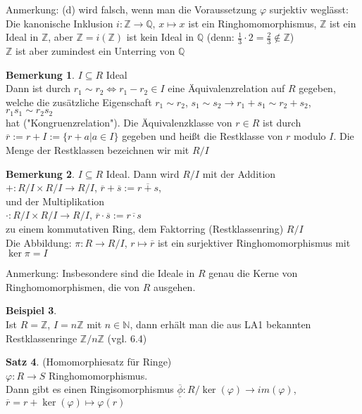 \documentclass[10pt,a4paper,numbers=endperiod]{scrartcl}
\theoremstyle{definition}
\newtheorem{satz}{Satz}[section]
\newtheorem{bem}[satz]{Bemerkung}
\newtheorem{bsp}[satz]{Beispiel}
\def\QQ{{\mathbb Q}}
\def\NN{{\mathbb N}}
\def\ZZ{{\mathbb Z}}
\begin{document}
Anmerkung: (d) wird falsch, wenn man die Voraussetzung $\varphi$ surjektiv weglässt:\\
Die kanonische Inklusion $i: \ZZ \rightarrow \QQ$, $x \mapsto x$ ist ein Ringhomomorphismus, $\ZZ$ ist ein Ideal in $\ZZ$, aber $\ZZ = i(\ZZ)$ ist kein Ideal in $\QQ$ (denn: $\frac{1}{3} \cdot 2 = \frac{2}{3} \notin \ZZ$)\\
$\ZZ$ ist aber zumindest ein Unterring von $\QQ$
\newpage
\begin{bem}
	$I \subseteq R$ Ideal\\
	Dann ist durch $r_1 \sim r_2 \Leftrightarrow r_1 - r_2 \in I$ eine Äquivalenzrelation auf $R$ gegeben, welche die zusätzliche Eigenschaft $r_1 \sim r_2$, $s_1 \sim s_2 \rightarrow r_1 + s_1 \sim r_2 + s_2$, $r_1s_1 \sim r_2s_2$\\
	hat ("Kongruenzrelation"). Die Äquivalenzklasse von $r \in R$ ist durch 
	$\overline{r} := r + I := \{r+a| a \in I \}$ gegeben und heißt die Restklasse von $r$ modulo $I$. Die Menge der Restklassen bezeichnen wir mit $R/I$
\end{bem}

\begin{bem}
	$I \subseteq R$ Ideal. Dann wird $R/I$ mit der Addition\\
	$+: R/I \times R/I \rightarrow R/I$, $\overline{r} + \overline{s} := \overline{r+s}$,\\
	und der Multiplikation\\
	$\cdot: R/I \times R/I \rightarrow R/I$, $\overline{r} \cdot \overline{s} := \overline{r \cdot s}$\\
	zu einem kommutativen Ring, dem Faktorring (Restklassenring) $R/I$\\
	Die Abbildung: $\pi: R \rightarrow R/I$, $r \mapsto \overline{r}$ ist ein surjektiver Ringhomomorphismus mit $\ker \pi = I$ 
\end{bem}

Anmerkung: Insbesondere sind die Ideale in $R$ genau die Kerne von Ringhomomorphismen, die von $R$ ausgehen.

\begin{bsp}
	 $ $\\
	 Ist $R = \ZZ$, $I = n\ZZ$ mit $n \in \NN$, dann erhält man die aus LA1 bekannten Restklassenringe $\ZZ/n\ZZ$ (vgl. 6.4) 
\end{bsp}

\begin{satz}
	(Homomorphiesatz für Ringe)\\
	$\varphi: R \rightarrow S$ Ringhomomorphismus.\\
	Dann gibt es einen Ringisomorphismus $\overline{\underline{\phi}}: R/\ker(\varphi) \rightarrow im(\varphi)$, $\overline{r}= r + \ker(\varphi) \mapsto \varphi(r)$
\end{satz}
\end{document}
